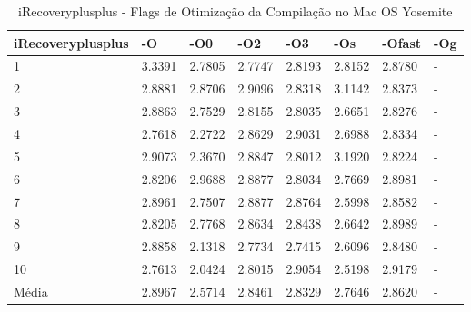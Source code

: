 \begin{table}[!ht]
\tiny
\centering
\caption{iRecoveryplusplus - Flags de Otimização da Compilação no Mac OS Yosemite}
\label{tab:otimizacao_compilacao:mac:irecoveryplusplus}
\begin{tabular}{llllllll}
\textbf{iRecoveryplusplus} & \textbf{-O}  & \textbf{-O0}   & \textbf{-O2} & \textbf{-O3} & \textbf{-Os} & \textbf{-Ofast} & \textbf{-Og} \\ \toprule
1                          & 3.3391       &   2.7805       &  2.7747      &  2.8193      &  2.8152      &   2.8780        &  -           \\ 
2                          & 2.8881       &   2.8706       &  2.9096      &  2.8318      &  3.1142      &   2.8373        &  -           \\ 
3                          & 2.8863       &   2.7529       &  2.8155      &  2.8035      &  2.6651      &   2.8276        &  -           \\ 
4                          & 2.7618       &   2.2722       &  2.8629      &  2.9031      &  2.6988      &   2.8334        &  -           \\ 
5                          & 2.9073       &   2.3670      &  2.8847      &  2.8012      &  3.1920      &   2.8224        &  -           \\ 
6                          & 2.8206       &   2.9688      &  2.8877      &  2.8034      &  2.7669      &   2.8981        &  -           \\ 
7                          & 2.8961       &   2.7507      &  2.8877      &  2.8764      &  2.5998      &   2.8582        &  -           \\ 
8                          & 2.8205       &   2.7768      &  2.8634      &  2.8438      &  2.6642      &   2.8989        &  -           \\ 
9                          & 2.8858       &   2.1318      &  2.7734      &  2.7415      &  2.6096      &   2.8480        &  -           \\ 
10                         & 2.7613       &   2.0424      &  2.8015      &  2.9054      &  2.5198      &   2.9179        &  -           \\ \bottomrule
Média                      & 2.8967       &   2.5714      &  2.8461      &  2.8329      &  2.7646      &   2.8620        &  -           \\ 
\end{tabular}
\end{table}


